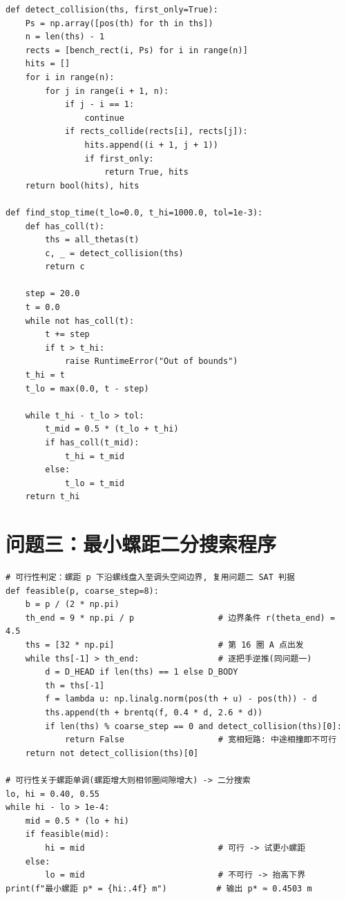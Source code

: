 ﻿\documentclass{cumcmthesis}
\begin{document}
\begin{appendices}
\begin{lstlisting}
def detect_collision(ths, first_only=True):
    Ps = np.array([pos(th) for th in ths])
    n = len(ths) - 1 
    rects = [bench_rect(i, Ps) for i in range(n)]
    hits = []
    for i in range(n):
        for j in range(i + 1, n):
            if j - i == 1: 
                continue
            if rects_collide(rects[i], rects[j]):
                hits.append((i + 1, j + 1)) 
                if first_only:
                    return True, hits
    return bool(hits), hits

def find_stop_time(t_lo=0.0, t_hi=1000.0, tol=1e-3):
    def has_coll(t):
        ths = all_thetas(t)
        c, _ = detect_collision(ths)
        return c

    step = 20.0
    t = 0.0
    while not has_coll(t):
        t += step
        if t > t_hi:
            raise RuntimeError("Out of bounds")
    t_hi = t
    t_lo = max(0.0, t - step)

    while t_hi - t_lo > tol:
        t_mid = 0.5 * (t_lo + t_hi)
        if has_coll(t_mid):
            t_hi = t_mid
        else:
            t_lo = t_mid
    return t_hi
\end{lstlisting}
\section{问题三：最小螺距二分搜索程序}
\begin{lstlisting}
# 可行性判定：螺距 p 下沿螺线盘入至调头空间边界, 复用问题二 SAT 判据
def feasible(p, coarse_step=8):
    b = p / (2 * np.pi)
    th_end = 9 * np.pi / p                 # 边界条件 r(theta_end) = 4.5
    ths = [32 * np.pi]                     # 第 16 圈 A 点出发
    while ths[-1] > th_end:                # 逐把手逆推(同问题一)
        d = D_HEAD if len(ths) == 1 else D_BODY
        th = ths[-1]
        f = lambda u: np.linalg.norm(pos(th + u) - pos(th)) - d
        ths.append(th + brentq(f, 0.4 * d, 2.6 * d))
        if len(ths) % coarse_step == 0 and detect_collision(ths)[0]:
            return False                   # 宽相短路: 中途相撞即不可行
    return not detect_collision(ths)[0]

# 可行性关于螺距单调(螺距增大则相邻圈间隙增大) -> 二分搜索
lo, hi = 0.40, 0.55
while hi - lo > 1e-4:
    mid = 0.5 * (lo + hi)
    if feasible(mid):
        hi = mid                           # 可行 -> 试更小螺距
    else:
        lo = mid                           # 不可行 -> 抬高下界
print(f"最小螺距 p* = {hi:.4f} m")          # 输出 p* ≈ 0.4503 m
\end{lstlisting}


\end{appendices}
\end{document}
